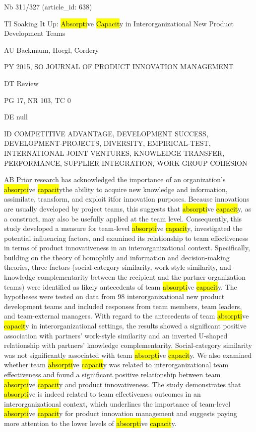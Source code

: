 \documentclass[a4paper]{article}
\begin{document}
\vspace*{-2cm}
Nb \tabto{0cm}311/327 (article\_id: 638)\par
TI \tabto{0cm}Soaking It Up: \hl{Absorpti}ve \hl{Capacit}y in Interorganizational New Product Development Teams\par
AU \tabto{0cm}Backmann, Hoegl, Cordery\par
PY \tabto{0cm}2015, SO JOURNAL OF PRODUCT INNOVATION MANAGEMENT\par
DT \tabto{0cm}Review\par
PG \tabto{0cm}17, NR 103, TC 0\par
DE \tabto{0cm}null\par
ID \tabto{0cm}COMPETITIVE ADVANTAGE, DEVELOPMENT SUCCESS, DEVELOPMENT-PROJECTS, DIVERSITY, EMPIRICAL-TEST, INTERNATIONAL JOINT VENTURES, KNOWLEDGE TRANSFER, PERFORMANCE, SUPPLIER INTEGRATION, WORK GROUP COHESION\par
AB \tabto{0cm}Prior research has acknowledged the importance of an organization's \hl{absorpti}ve \hl{capacit}ythe ability to acquire new knowledge and information, assimilate, transform, and exploit itfor innovation purposes. Because innovations are usually developed by project teams, this suggests that \hl{absorpti}ve \hl{capacit}y, as a construct, may also be usefully applied at the team level. Consequently, this study developed a measure for team-level \hl{absorpti}ve \hl{capacit}y, investigated the potential influencing factors, and examined its relationship to team effectiveness in terms of product innovativeness in an interorganizational context. Specifically, building on the theory of homophily and information and decision-making theories, three factors (social-category similarity, work-style similarity, and knowledge complementarity between the recipient and the partner organization teams) were identified as likely antecedents of team \hl{absorpti}ve \hl{capacit}y. The hypotheses were tested on data from 98 interorganizational new product development teams and included responses from team members, team leaders, and team-external managers. With regard to the antecedents of team \hl{absorpti}ve \hl{capacit}y in interorganizational settings, the results showed a significant positive association with partners' work-style similarity and an inverted U-shaped relationship with partners' knowledge complementarity. Social-category similarity was not significantly associated with team \hl{absorpti}ve \hl{capacit}y. We also examined whether team \hl{absorpti}ve \hl{capacit}y was related to interorganizational team effectiveness and found a significant positive relationship between team \hl{absorpti}ve \hl{capacit}y and product innovativeness. The study demonstrates that \hl{absorpti}ve is indeed related to team effectiveness outcomes in an interorganizational context, which underlines the importance of team-level \hl{absorpti}ve \hl{capacit}y for product innovation management and suggests paying more attention to the lower levels of \hl{absorpti}ve \hl{capacit}y.\par
\clearpage
\end{document}
